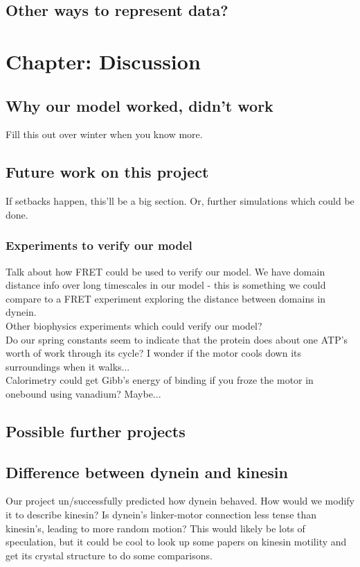 \documentclass[10pt]{article} %
\begin{document}
\subsection{Other ways to represent data?}

\section{Chapter: Discussion}
\subsection{Why our model worked, didn’t work}
Fill this out over winter when you know more.\\
\subsection{Future work on this project}
If setbacks happen, this'll be a big section. Or, further simulations which could be done.

\subsubsection{Experiments to verify our model}
Talk about how FRET could be used to verify our model. We have domain distance info over long
timescales in our model - this is something we could compare to a FRET experiment exploring
the distance between domains in dynein.\\

Other biophysics experiments which could verify our model?\\

Do our spring constants seem to indicate that the protein does about one ATP's worth of work through its cycle? I wonder if the motor cools down its surroundings when it walks...\\

Calorimetry could get Gibb's energy of binding if you froze the motor in onebound using
vanadium? Maybe...\\
\subsection{Possible further projects}
\subsection{Difference between dynein and kinesin}
Our project un/successfully predicted how dynein behaved. How would we modify it to describe kinesin?
Is dynein's linker-motor connection less tense than kinesin's, leading to more random motion? This
would likely be lots of speculation, but it could be cool to look up some papers on kinesin motility
and get its crystal structure to do some comparisons.
\end{document}

